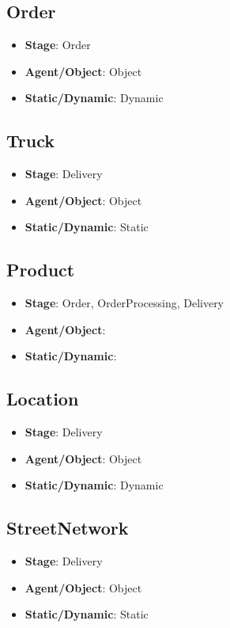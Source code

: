 \documentclass[12pt]{article}
\begin{document}
\subsection{Order}%
\label{sub:order}
\begin{itemize}
    \item \textbf{Stage}: Order
    \item \textbf{Agent/Object}: Object
    \item \textbf{Static/Dynamic}: Dynamic
\end{itemize}

\subsection{Truck}%
\label{sub:truck}
\begin{itemize}
    \item \textbf{Stage}: Delivery
    \item \textbf{Agent/Object}: Object
    \item \textbf{Static/Dynamic}: Static
\end{itemize}

\subsection{Product}%
\label{sub:product}
\begin{itemize}
    \item \textbf{Stage}: Order, OrderProcessing, Delivery
    \item \textbf{Agent/Object}: 
    \item \textbf{Static/Dynamic}: 
\end{itemize}

\subsection{Location}%
\label{sub:location}
\begin{itemize}
    \item \textbf{Stage}: Delivery
    \item \textbf{Agent/Object}: Object
    \item \textbf{Static/Dynamic}: Dynamic
\end{itemize}

\subsection{StreetNetwork}%
\label{sub:street_network}
\begin{itemize}
    \item \textbf{Stage}: Delivery
    \item \textbf{Agent/Object}: Object
    \item \textbf{Static/Dynamic}: Static
\end{itemize}
\end{document}
